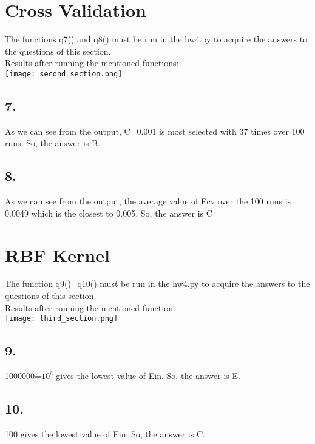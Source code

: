 \documentclass{homework}
\begin{document}
\section*{Cross Validation}
The functions q7() and q8() must be run in the hw4.py to acquire the answers to the questions of this section.\\
Results after running the mentioned functions:\\
\texttt{[image: second\_section.png]}

\subsection*{7.} 
As we can see from the output, C=0.001 is most selected with 37 times over 100 runs.
So, the answer is B.
\subsection*{8.} 
As we can see from the output, the average value of Ecv over the 100 runs is 0.0049 which is the closest to 0.005.
So, the answer is C

\section*{RBF Kernel}
The function q9()_q10() must be run in the hw4.py to acquire the answers to the questions of this section.\\
Results after running the mentioned function:\\
\texttt{[image: third\_section.png]}

\subsection*{9.} 
1000000=\(10^6\) gives the lowest value of Ein.
So, the answer is E.
\subsection*{10.} 
100 gives the lowest value of Ein.
So, the answer is C.
\end{document}
